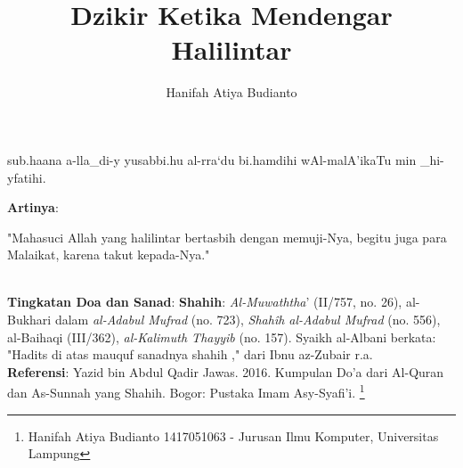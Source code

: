 \documentclass[a4paper,12pt]{article}
\title{\LARGE Dzikir Ketika Mendengar Halilintar}
\author{\calligra Hanifah Atiya Budianto}
\begin{document}
\sffamily
\maketitle 
\fullvocalize
{}
\begin{arabtext}
\noindent
sub.haana a-lla_di-y yusabbi.hu al-rra`du bi.hamdihi wAl-malA'ikaTu min
_hi-yfatihi.\\
\end{arabtext}
\noindent
\textbf{Artinya}:
\par
\indent
"Mahasuci Allah yang halilintar bertasbih dengan memuji-Nya, begitu juga 
para Malaikat, karena takut kepada-Nya."\\\\
\par
\noindent
\textbf{Tingkatan Doa dan Sanad}: \textbf{Shahih}: \textit{Al-Muwaththa}'
(II/757, no. 26), al-Bukhari dalam \textit{al-Adabul Mufrad} (no. 723),
\textit{Shah\^{i}h al-Adabul Mufrad} (no. 556), al-Baihaqi (III/362),
\textit{al-Kalimuth Thayyib} (no. 157). Syaikh al-Albani berkata: "Hadits 
di atas mauquf sanadnya shahih ," dari Ibnu az-Zubair r.a. \\
\textbf{Referensi}: Yazid bin Abdul Qadir Jawas. 2016. Kumpulan Do'a dari
Al-Quran dan As-Sunnah yang Shahih. Bogor: Pustaka Imam Asy-Syafi'i.
\footnote{Hanifah Atiya Budianto 1417051063 - Jurusan Ilmu Komputer,
Universitas Lampung}
\end{document}
